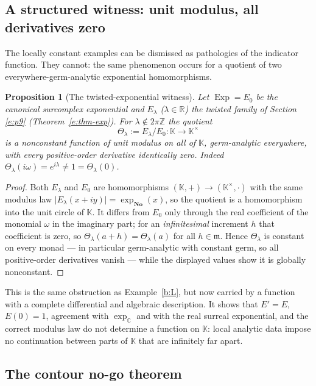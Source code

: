 \documentclass[11pt,a4paper]{article}
\numberwithin{equation}{section}
\newtheorem{proposition}[theorem]{Proposition}
\theoremstyle{definition}
\theoremstyle{remark}
\theoremstyle{plain}
\newcommand{\K}{\mathbb K}
\newcommand{\No}{\mathbf{No}}
\newcommand{\CC}{\mathbb C}
\newcommand{\RR}{\mathbb R}
\newcommand{\ZZ}{\mathbb Z}
\newcommand{\mm}{\mathfrak m}
\DeclareMathOperator{\Exp}{Exp}
\newcommand{\abs}[1]{\lvert #1\rvert}
\begin{document}
\subsection{A structured witness: unit modulus, all derivatives zero}

The locally constant examples can be dismissed as pathologies of the
indicator function. They cannot: the same phenomenon occurs for a
quotient of two everywhere-germ-analytic exponential homomorphisms.

\begin{proposition}[The twisted-exponential witness]
\label{b:twistwitness}
Let $\Exp=E_0$ be the canonical surcomplex exponential and $E_\lambda$
($\lambda\in\RR$) the twisted family of Section \ref{e:p9}
(Theorem~\ref{e:thm-exp}). For $\lambda\notin2\pi\ZZ$ the quotient
\[
 \Theta_\lambda:=E_\lambda/E_0:\K\longrightarrow\K^{\times}
\]
is a nonconstant function of unit modulus on all of $\K$, germ-analytic
everywhere, with every positive-order derivative identically zero. Indeed
$\Theta_\lambda(i\omega)=e^{i\lambda}\ne1=\Theta_\lambda(0)$.
\end{proposition}

\begin{proof}
Both $E_\lambda$ and $E_0$ are homomorphisms $(\K,+)\to(\K^{\times},\cdot)$
with the same modulus law $\abs{E_\lambda(x+iy)}=\exp_{\No}(x)$, so the
quotient is a homomorphism into the unit circle of $\K$. It differs from
$E_0$ only through the real coefficient of the monomial $\omega$ in the
imaginary part; for an \emph{infinitesimal} increment $h$ that
coefficient is zero, so $\Theta_\lambda(a+h)=\Theta_\lambda(a)$ for all
$h\in\mm$. Hence $\Theta_\lambda$ is constant on every monad --- in
particular germ-analytic with constant germ, so all positive-order
derivatives vanish --- while the displayed values show it is globally
nonconstant.
\end{proof}

This is the same obstruction as Example~\ref{b:L}, but now carried by a
function with a complete differential and algebraic description. It shows
that $E'=E$, $E(0)=1$, agreement with $\exp_{\CC}$ and with the real
surreal exponential, and the correct modulus law do not determine a
function on $\K$: local analytic data impose no continuation between
parts of $\K$ that are infinitely far apart.

\subsection{The contour no-go theorem}
\end{document}
